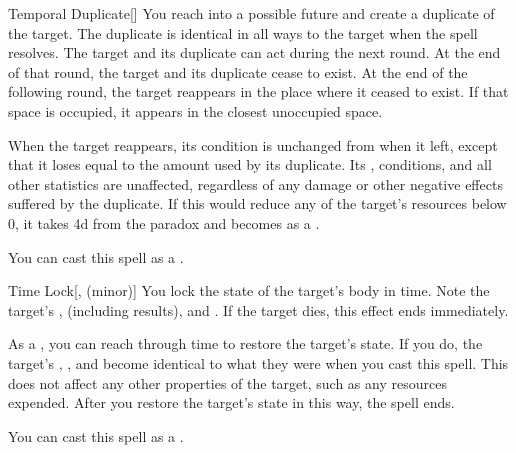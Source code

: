 \lowercase{\hypertarget{spell:Temporal Duplicate}{}}\label{spell:Temporal Duplicate}
\begin{freeability}[Rank 5]{\hypertarget{spell:Temporal Duplicate}{Temporal Duplicate}}[]
You reach into a possible future and create a duplicate of the target.
The duplicate is identical in all ways to the target when the spell resolves.
The target and its duplicate can act during the next round.
At the end of that round, the target and its duplicate cease to exist.
At the end of the following round, the target reappears in the place where it ceased to exist.
If that space is occupied, it appears in the closest unoccupied space.

When the target reappears, its condition is unchanged from when it left, except that it loses  equal to the amount used by its duplicate.
Its , conditions, and all other statistics are unaffected, regardless of any damage or other negative effects suffered by the duplicate.
If this would reduce any of the target's resources below 0, it takes  \plus4d from the paradox and becomes  as a .

You can cast this spell as a .
\end{freeability}
\vspace{0.25em}



\lowercase{\hypertarget{spell:Time Lock}{}}\label{spell:Time Lock}
\begin{freeability}[Rank 5]{\hypertarget{spell:Time Lock}{Time Lock}}[,  (minor)]
You lock the state of the target's body in time.
Note the target's ,  (including  results), and .
If the target dies, this effect ends immediately.

As a , you can reach through time to restore the target's state.
If you do, the target's , , and  become identical to what they were when you cast this spell.
This does not affect any other properties of the target, such as any resources expended.
After you restore the target's state in this way, the spell ends.

You can cast this spell as a .
\end{freeability}
\vspace{0.25em}



